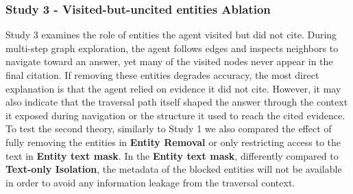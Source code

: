 \documentclass[
]{ceurart}
\begin{document}
\subsubsection*{Study 3 - Visited-but-uncited entities Ablation}

Study 3 examines the role of entities the agent visited but did not cite. During multi-step graph exploration, the agent follows edges and inspects neighbors to navigate toward an answer, yet many of the visited nodes never appear in the final citation. If removing these entities degrades accuracy, the most direct explanation is that the agent relied on evidence it did not cite. However, it may also indicate that the traversal path itself shaped the answer through the context it exposed during navigation or the structure it used to reach the cited evidence. To test the second theory, similarly to Study 1 we also compared the effect of fully removing the entities in \textbf{Entity Removal} or only restricting access to the text in \textbf{Entity text mask}. In the \textbf{Entity text mask}, differently compared to \textbf{Text-only Isolation}, the metadata of the blocked entities will not be available in order to avoid any information leakage from the traversal context.



\end{document}

